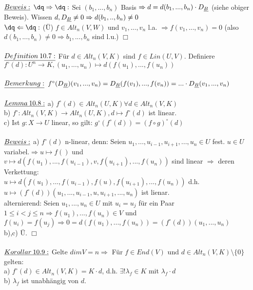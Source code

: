 \documentclass[fleqn, a4paper, 11pt]{scrartcl}
\theoremstyle{definition}
\begin{document}
\\
$\uline{Beweis:}$ $\dq\Rightarrow\dq:$ Sei $(b_1,...,b_n)$ Basis $\Rightarrow d=d(b_1,...,b_n)\cdot D_{\uline{B}}$ (siehe obiger Beweis). Wissen $d,D_{\uline{B}}\neq 0\Rightarrow d(b_1,..,b_n)\neq 0$\\
$\dq\Leftarrow\dq:$ (\"U) $f\in Alt_n(V,W)$ und $v_1,...,v_n$ l.a. $\Rightarrow f(v_1,...,v_n)=0$ (also $d(b_1,...,b_n)\neq 0\Rightarrow b_1,...,b_n$ sind l.u.) \hfill $\Box$\\
\\
$\uline{Definition\:10.7:}$ Für $d\in Alt_n(V,K)$ sind $f\in Lin(U,V)$. Definiere $f^{\circ}(d):U^n\rightarrow K,(u_1,...,u_n)\mapsto d(f(u_1),...,f(u_n))$\\
\\
$\uline{Bemerkung:}$ $f^{\circ}(D_{\uline{B}})(v_1,...,v_n)=D_{\uline{B}}(f(v_1),...,f(v_n))=...\cdot D_{\uline{B}}(v_1,...,v_n)$\\
\\
$\uline{Lemma\:10.8:}$ a) $f^{\circ}(d)\in Alt_n(U,K) \forall d\in Alt_n(V,K)$\\
b) $f^{\circ}:Alt_n(V,K)\rightarrow Alt_n(U,K),d\mapsto f^{\circ}(d)$ ist linear.\\
c) Ist $g:X\rightarrow U$ linear, so gilt: $g^{\circ}(f^{\circ}(d))=(f\circ g)^{\circ}(d)$\\
\\
$\uline{Beweis:}$ a) $f^{\circ}(d)$ n-linear, denn: Seien $u_1,...,u_{i-1},u_{i+1},...,u_n\in U$ fest. $u\in U$ variabel.$\Rightarrow u\mapsto f()$ und $v\mapsto d(f(u_1),...,f(u_{i-1}),v,f(u_{i+1}),...,f(u_n))$ sind linear $\Rightarrow$ deren Verkettung:\\
$u\mapsto d(f(u_1),...,f(u_{i-1}),f(u),f(u_{i+1}),...,f(u_n))$ d.h. $u\mapsto (f^{\circ}(d))(u_1,...,u_{i-1},u,u_{i+1},...,u_n)$ ist lienar.\\
alternierend: Seien $u_1,...,u_n\in U$ mit $u_i=u_j$ für ein Paar $1\leq i<j\leq n\Rightarrow f(u_1),...,f(u_n)\in V$ und $f(u_i)=f(u_j)\Rightarrow 0=d(f(u_1),...,f(u_n))=(f^{\circ}(d))(u_1,...,u_n)$\\
b),c) \"U. \hfill $\Box$\\
\\
$\uline{Korollar\:10.9:}$ Gelte $dim V=n\Rightarrow$ Für $f\in End(V)$ und $d\in Alt_n(V,K)\setminus\{0\}$ gelten:\\
a) $f^{\circ}(d)\in Alt_n(V,K)=K\cdot d$, d.h. $\exists!\lambda_f\in K$ mit $\lambda_f\cdot d$\\
b) $\lambda_f$ ist unabhängig von $d$.\\
\end{document}
